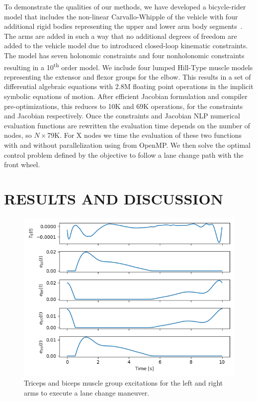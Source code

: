 \documentclass[11pt,twocolumn]{article}
\begin{document}
To demonstrate the qualities of our methods, we have developed a bicycle-rider
model that includes the non-linear Carvallo-Whipple of the vehicle with four
additional rigid bodies representing the upper and lower arm body
segments~\cite{Stienstra2023a}. The arms are added in such a way that no
additional degrees of freedom are added to the vehicle model due to introduced
closed-loop kinematic constraints. The model has seven holonomic constraints and
four nonholonomic constraints resulting in a 10\textsuperscript{th} order model.
We include four lumped Hill-Type muscle models representing the extensor and
flexor groups for the elbow. This results in a set of differential algebraic
equations with 2.8M floating point operations in the implicit symbolic equations
of motion. After efficient Jacobian formulation and compiler pre-optimizations,
this reduces to 10K and 69K operations, for the constraints and Jacobian
respectively. Once the constraints and Jacobian NLP numerical evaluation
functions are rewritten the evaluation time depends on the number of nodes, so
\(N\times\)79K. For X nodes we time the evaluation of these two functions with
and without parallelization using from OpenMP. We then solve the optimal control
problem defined by the objective to follow a lane change path with the front
wheel.

\section*{RESULTS AND DISCUSSION}
%
\begin{figure}
    \centering
    \includegraphics[width=\linewidth]{figures/arm-muscle-bicycle-excitation.png}
    \caption{Triceps and biceps muscle group excitations for the left and right arms to execute a lane change maneuver.}
    \label{fig:enter-label}
\end{figure}
\end{document}
